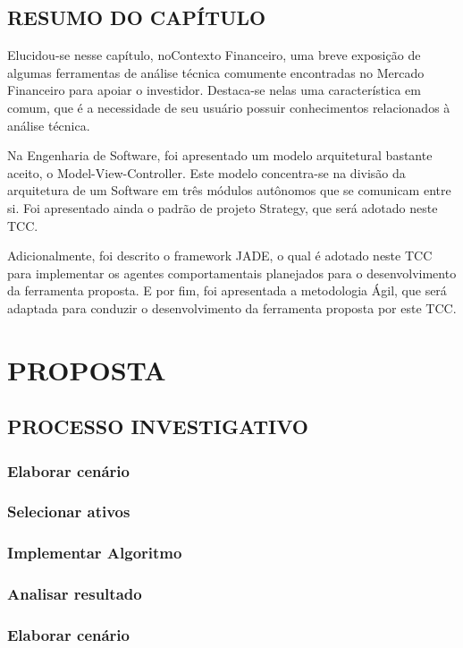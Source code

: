 \section{RESUMO DO CAPÍTULO}

Elucidou-se nesse capítulo, noContexto Financeiro, uma breve exposição de algumas ferramentas de análise técnica comumente encontradas no Mercado Financeiro para apoiar o investidor. Destaca-se nelas uma característica em comum, que é a necessidade de seu usuário possuir conhecimentos relacionados à análise técnica. 

Na Engenharia de Software, foi apresentado um modelo arquitetural bastante aceito, o Model-View-Controller. Este modelo concentra-se na divisão da arquitetura de um Software em três módulos autônomos que se comunicam entre si. Foi apresentado ainda o padrão de projeto Strategy, que será adotado neste TCC. 

Adicionalmente, foi descrito o framework JADE, o qual é adotado neste TCC para implementar os agentes comportamentais planejados para o desenvolvimento da ferramenta proposta. E por fim, foi apresentada a metodologia Ágil, que será adaptada para conduzir o desenvolvimento da ferramenta proposta por este TCC.


\chapter[PROPOSTA]{PROPOSTA}
\section{PROCESSO INVESTIGATIVO}
\subsection{Elaborar cenário}
\subsection{Selecionar ativos}
\subsection{Implementar Algoritmo}
\subsection{Analisar resultado}
\subsection{Elaborar cenário}
